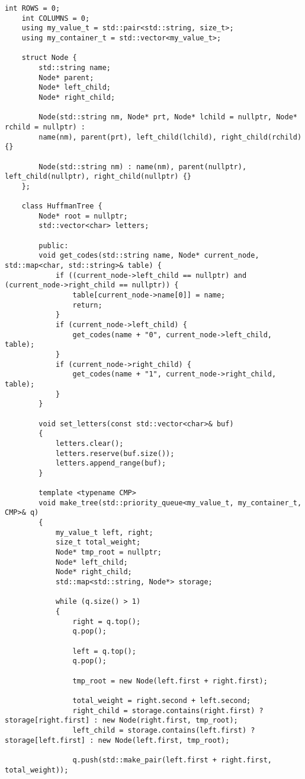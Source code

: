 
\begin{lstlisting}[label = list1, caption = Программная реализация описанных алгоритмов структур]
	int ROWS = 0;
	int COLUMNS = 0;
	using my_value_t = std::pair<std::string, size_t>;
	using my_container_t = std::vector<my_value_t>;
	
	struct Node {
		std::string name;
		Node* parent;
		Node* left_child;
		Node* right_child;
		
		Node(std::string nm, Node* prt, Node* lchild = nullptr, Node* rchild = nullptr) :
		name(nm), parent(prt), left_child(lchild), right_child(rchild) {}
		
		Node(std::string nm) : name(nm), parent(nullptr), left_child(nullptr), right_child(nullptr) {}
	};
	
	class HuffmanTree {
		Node* root = nullptr;
		std::vector<char> letters;
		
		public:
		void get_codes(std::string name, Node* current_node, std::map<char, std::string>& table) {
			if ((current_node->left_child == nullptr) and (current_node->right_child == nullptr)) {
				table[current_node->name[0]] = name;
				return;
			}
			if (current_node->left_child) {
				get_codes(name + "0", current_node->left_child, table);
			}
			if (current_node->right_child) {
				get_codes(name + "1", current_node->right_child, table);
			}
		}
		
		void set_letters(const std::vector<char>& buf) 
		{
			letters.clear();
			letters.reserve(buf.size());
			letters.append_range(buf);
		}
		
		template <typename CMP>
		void make_tree(std::priority_queue<my_value_t, my_container_t, CMP>& q)
		{
			my_value_t left, right;
			size_t total_weight;
			Node* tmp_root = nullptr;
			Node* left_child;
			Node* right_child;
			std::map<std::string, Node*> storage;
			
			while (q.size() > 1)
			{				
				right = q.top();
				q.pop();
				
				left = q.top();
				q.pop();
				
				tmp_root = new Node(left.first + right.first);
				
				total_weight = right.second + left.second;
				right_child = storage.contains(right.first) ? storage[right.first] : new Node(right.first, tmp_root);
				left_child = storage.contains(left.first) ? storage[left.first] : new Node(left.first, tmp_root);
				
				q.push(std::make_pair(left.first + right.first, total_weight));
				

\end{lstlisting}
